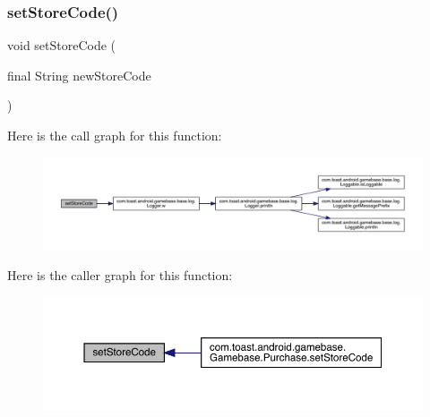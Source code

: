 \subsubsection{\texorpdfstring{set\+Store\+Code()}{setStoreCode()}}
{\footnotesize\ttfamily void set\+Store\+Code (\begin{DoxyParamCaption}\item[{final String}]{new\+Store\+Code }\end{DoxyParamCaption})\hspace{0.3cm}{\ttfamily [protected]}}

Here is the call graph for this function\+:
\nopagebreak
\begin{figure}[H]
\begin{center}
\leavevmode
\includegraphics[width=350pt]{classcom_1_1toast_1_1android_1_1gamebase_1_1_gamebase_system_info_a16b2f5edffda1b725d31c6f3b157c0bb_cgraph}
\end{center}
\end{figure}
Here is the caller graph for this function\+:
\nopagebreak
\begin{figure}[H]
\begin{center}
\leavevmode
\includegraphics[width=350pt]{classcom_1_1toast_1_1android_1_1gamebase_1_1_gamebase_system_info_a16b2f5edffda1b725d31c6f3b157c0bb_icgraph}
\end{center}
\end{figure}
